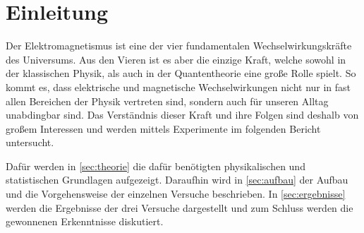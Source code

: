 \section{Einleitung}
\label{sec:einleitung}

Der Elektromagnetismus ist eine der vier fundamentalen Wechselwirkungskräfte des Universums. Aus den Vieren ist es aber die einzige Kraft, welche sowohl in der klassischen Physik, als auch in der Quantentheorie eine große Rolle spielt. So kommt es, dass elektrische und magnetische Wechselwirkungen nicht nur in fast allen Bereichen der Physik vertreten sind, sondern auch für unseren Alltag unabdingbar sind. Das Verständnis dieser Kraft und ihre Folgen sind deshalb von großem Interessen und werden mittels Experimente im folgenden Bericht untersucht. 

Dafür werden in \autoref{sec:theorie} die dafür benötigten physikalischen und statistischen Grundlagen aufgezeigt. Daraufhin wird in \autoref{sec:aufbau} der Aufbau und die Vorgehensweise der einzelnen Versuche beschrieben. In \autoref{sec:ergebnisse} werden die Ergebnisse der drei Versuche dargestellt und zum Schluss werden die gewonnenen Erkenntnisse diskutiert.
